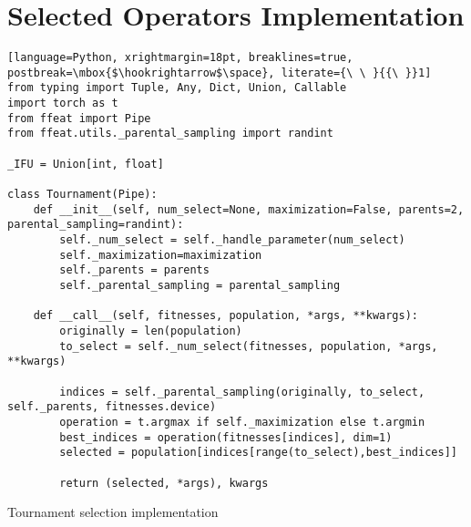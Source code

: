 \chapter{Selected Operators Implementation}
\label{chap:examples}

\begin{algorithm}
\begin{lstlisting}[language=Python, xrightmargin=18pt, breaklines=true, postbreak=\mbox{$\hookrightarrow$\space}, literate={\ \ }{{\ }}1]
from typing import Tuple, Any, Dict, Union, Callable
import torch as t
from ffeat import Pipe
from ffeat.utils._parental_sampling import randint

_IFU = Union[int, float]

class Tournament(Pipe):
    def __init__(self, num_select=None, maximization=False, parents=2, parental_sampling=randint):
        self._num_select = self._handle_parameter(num_select)
        self._maximization=maximization
        self._parents = parents
        self._parental_sampling = parental_sampling

    def __call__(self, fitnesses, population, *args, **kwargs):
        originally = len(population)
        to_select = self._num_select(fitnesses, population, *args, **kwargs)

        indices = self._parental_sampling(originally, to_select, self._parents, fitnesses.device)
        operation = t.argmax if self._maximization else t.argmin
        best_indices = operation(fitnesses[indices], dim=1)
        selected = population[indices[range(to_select),best_indices]]

        return (selected, *args), kwargs
\end{lstlisting}
\caption{Tournament selection implementation}
\label{alg:impltournament}
\end{algorithm}

